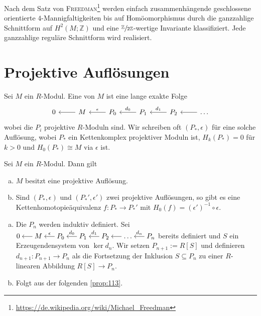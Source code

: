 \begin{ausblick}
	Nach dem Satz von \textsc{Freedman}\footnote{\url{https://de.wikipedia.org/wiki/Michael_Freedman}} werden einfach zusammenhängende geschlossene orientierte $4$-Mannigfaltigkeiten bis auf Homöomorphismus durch die ganzzahlige Schnittform auf $H^2(M;\mathbb{Z})$ und eine $\sfrac{\mathbb{Z}}{2 \mathbb{Z}}$-wertige Invariante klassifiziert.
	Jede ganzzahlige reguläre Schnittform wird realisiert.
\end{ausblick}
\newpage

\section{Projektive Auflösungen} %
\label{sec:11}

\begin{definition}[{name=[projektive Auflösung]}]
	Sei $M$ ein $R$-Modul.
	Eine  von $M$ ist eine lange exakte Folge 
	\[
		\begin{tikzcd}
			0 & M \lar & P_0 \lar["\epsilon"'] & P_1 \lar["d_0"'] & P_2 \lar["d_1"'] & \ldots \lar
		\end{tikzcd}
	\]
	wobei die $P_i$ projektive $R$-Moduln sind.
	Wir schreiben oft $(P_*,\epsilon)$ für eine solche Auflösung, wobei $P_*$ ein Kettenkomplex projektiver Moduln ist, $H_k(P_*)=0$ für $k>0$ und $H_0(P_*)\cong M$ via $\epsilon$ ist.
\end{definition}

\begin{satz}[{name=[Existenz projektiver Auflösungen]}]
	Sei $M$ ein $R$-Modul. Dann gilt
	\begin{enumerate}[a),itemsep=0pt]
		\item $M$ besitzt eine projektive Auflösung.
		\item Sind $(P_*,\epsilon)$ und $(P_*',\epsilon')$ zwei projektive Auflösungen, so gibt es eine Kettenhomotopieäquivalenz $f \colon P_* \to P_*'$ mit $H_0(f)= (\epsilon') ^{-1} \circ \epsilon$.
	\end{enumerate}
\end{satz}
\begin{beweis}
	\begin{enumerate}[a),itemsep=0pt]
		\item Die $P_n$ werden induktiv definiert. 
		Sei 
		$\begin{tikzcd}[cramped,sep=1.5em]
			0 & M \lar & P_0 \lar["\epsilon"'] & P_1 \lar["d_0"'] & P_2 \lar["d_1"'] & \ldots \lar & P_n \lar["d_n"']
		\end{tikzcd}$
		bereits definiert und $S$ ein Erzeugendensystem von $\ker d_n$.
		Wir setzen $P_{n+1} := R[S]$ und definieren $d_{n+1} \colon P_{n+1} \to P_n$ als die Fortsetzung der Inklusion $S \subseteq P_n$ zu einer $R$-linearen Abbildung $R[S]\to P_n$.
		\item Folgt aus der folgenden \autoref{prop:113}.\qedhere
	\end{enumerate}
\end{beweis}

